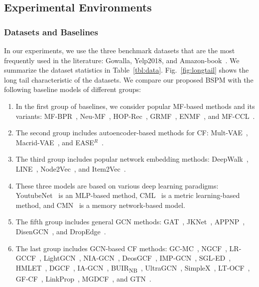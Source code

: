 \documentclass[sigconf,natbib=true]{acmart}
\begin{document}
\subsection{Experimental Environments}



\subsubsection{Datasets and Baselines}

In our experiments, we use the three benchmark datasets that are the most frequently used in the literature: Gowalla, Yelp2018, and Amazon-book~\cite{Wang19NGCF,chen20LRGCCF,He20LightGCN}.  We summarize the dataset statistics in Table~\ref{tbl:data}. Fig.~\ref{fig:longtail} shows the long tail characteristic of the datasets. We compare our proposed BSPM with the following baseline models of different groups:

\begin{enumerate}
    \item In the first group of baselines, we consider popular MF-based methods and its variants: MF-BPR~\cite{rendle2009BPR}, Neu-MF~\cite{He2017NCF}, HOP-Rec~\cite{yang2018hop},  GRMF~\cite{Rao2015GRMF}, ENMF~\cite{chen2020ENMF}, and MF-CCL~\cite{mao2021simplex}.
    \item The second group includes autoencoder-based methods for CF: Mult-VAE~\cite{Liang2018VAECF}, Macrid-VAE~\cite{ma2019macridvae}, and EASE$^R$~\cite{steck2019EASE}.  
    \item The third group includes popular network embedding methods: DeepWalk~\cite{perozzi2014deepwalk}, LINE~\cite{tang2015line}, Node2Vec~\cite{grover2016node2vec}, and Item2Vec~\cite{Oren2016Item2Vec}.
    \item These three models are based on various deep learning paradigms: YoutubeNet~\cite{Covington2016YoutubeNet} is an MLP-based method, CML~\cite{hsieh2017cml} is a metric learning-based method, and CMN~\cite{Ebesu2018CMN} is a memory network-based model.
    \item The fifth group includes general GCN methods: GAT~\cite{velickovic2018GAT}, JKNet~\cite{xu2018jknet}, APPNP~\cite{Klicpera2019APPNP}, DisenGCN~\cite{ma2019DisenGCN}, and DropEdge~\cite{rong2020dropedge}.
    \item The last group includes GCN-based CF methods: GC-MC~\cite{Rianne2017GCMC}, NGCF~\cite{Wang19NGCF}, LR-GCCF~\cite{chen20LRGCCF},  LightGCN~\cite{He20LightGCN}, NIA-GCN~\cite{sun2020NIA-GCN}, DeosGCF~\cite{liu2020deoscillated}, IMP-GCN~\cite{liu2021IMP-GCN}, SGL-ED~\cite{Wu2021SGLED}, HMLET~\cite{kong2022hmlet}, DGCF~\cite{Xiang2020DGCF19}, IA-GCN~\cite{zhang2022iagcn}, BUIR\textsubscript{NB}~\cite{lee2021BUIR}, UltraGCN~\cite{Mao21UltraGCN}, SimpleX~\cite{mao2021simplex}, LT-OCF~\cite{choi2021ltocf}, GF-CF~\cite{Shen21GFCF}, LinkProp~\cite{fu2022revisiting}, MGDCF~\cite{hu2022mgdcf}, and GTN~\cite{fan2022GTN}.
\end{enumerate}
\end{document}
